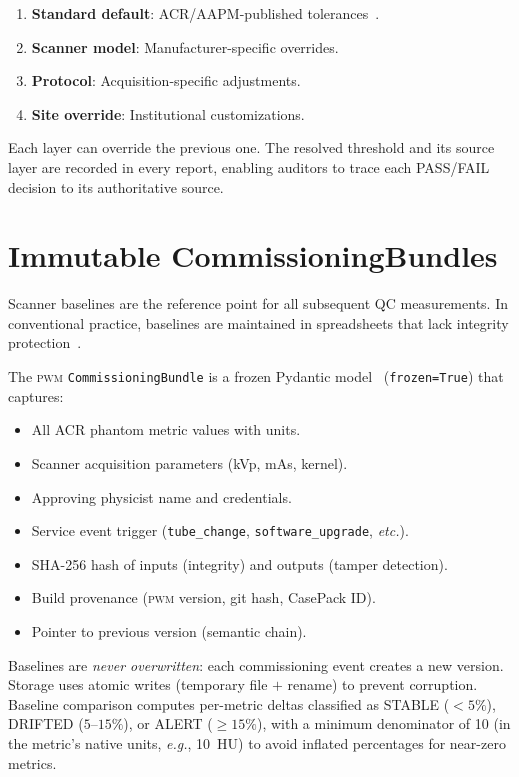 \documentclass[11pt]{article}
\newcommand{\pwm}{\textsc{pwm}}
\newcommand{\eg}{\textit{e.g.}}
\newcommand{\etc}{\textit{etc.}}
\begin{document}
\begin{enumerate}
  \item \textbf{Standard default}: ACR/AAPM-published
    tolerances~\cite{acr_ct_accreditation,aapm_tg233}.
  \item \textbf{Scanner model}: Manufacturer-specific overrides.
  \item \textbf{Protocol}: Acquisition-specific adjustments.
  \item \textbf{Site override}: Institutional customizations.
\end{enumerate}

Each layer can override the previous one.
The resolved threshold and its source layer are recorded in every
report, enabling auditors to trace each PASS/FAIL decision to its
authoritative source.


\section{Immutable CommissioningBundles}
\label{sec:baselines}

Scanner baselines are the reference point for all subsequent QC
measurements.
In conventional practice, baselines are maintained in spreadsheets
that lack integrity protection~\cite{nowik2015ct_qa_automation}.

The \pwm{} \texttt{CommissioningBundle} is a frozen Pydantic
model~\cite{pydantic} (\texttt{frozen=True}) that captures:

\begin{itemize}
  \item All ACR phantom metric values with units.
  \item Scanner acquisition parameters (kVp, mAs, kernel).
  \item Approving physicist name and credentials.
  \item Service event trigger (\texttt{tube\_change},
    \texttt{software\_upgrade}, \etc).
  \item SHA-256 hash of inputs (integrity) and outputs (tamper
    detection).
  \item Build provenance (\pwm{} version, git hash, CasePack ID).
  \item Pointer to previous version (semantic chain).
\end{itemize}

Baselines are \emph{never overwritten}: each commissioning event
creates a new version.
Storage uses atomic writes (temporary file $+$ rename) to prevent
corruption.
Baseline comparison computes per-metric deltas classified as
STABLE ($<5\%$), DRIFTED ($5$--$15\%$), or ALERT ($\geq 15\%$),
with a minimum denominator of 10 (in the metric's native units,
\eg, 10~HU) to avoid inflated percentages for near-zero metrics.
\end{document}
